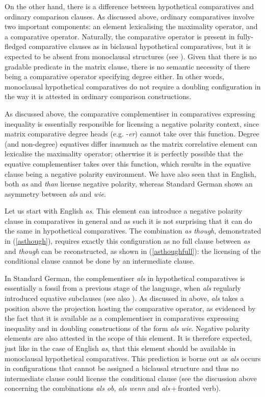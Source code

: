 On the other hand, there is a difference between hypothetical comparatives and ordinary comparison clauses. As discussed above, ordinary comparatives involve two important components: an element lexicalising the maximality operator, and a comparative operator. Naturally, the comparative operator is present in fully-fledged comparative clauses as in biclausal hypothetical comparatives, but it is expected to be absent from monoclausal structures (see \citealt{bacskaiatkari2018jb}). Given that there is no gradable predicate in the matrix clause, there is no semantic necessity of there being a comparative operator specifying degree either. In other words, monoclausal hypothetical comparatives do not require a doubling configuration in the way it is attested in ordinary comparison constructions.

As discussed above, the comparative complementiser in comparatives expressing inequality is essentially responsible for licensing a negative polarity context, since matrix comparative degree heads (e.g. -\textit{er}) cannot take over this function. Degree (and non-degree) equatives differ inasmuch as the matrix correlative element can lexicalise the maximality operator; otherwise it is perfectly possible that the equative complementiser takes over this function, which results in the equative clause being a negative polarity environment. We have also seen that in English, both \textit{as} and \textit{than} license negative polarity, whereas Standard German shows an asymmetry between \textit{als} and \textit{wie}.

Let us start with English \textit{as}. This element can introduce a negative polarity clause in comparatives in general and as such it is not surprising that it can do the same in hypothetical comparatives. The combination \textit{as though}, demonstrated in (\ref{asthough}), requires exactly this configuration as no full clause between \textit{as} and \textit{though} can be reconstructed, as shown in (\ref{asthoughfull}): the licensing of the conditional clause cannot be done by an intermediate clause.

In Standard German, the complementiser \textit{als} in hypothetical comparatives is essentially a fossil from a previous stage of the language, when \textit{als} regularly introduced equative subclauses (see also \citealt{jaeger2010, jaeger2018}). As discussed in  above, \textit{als} takes a position above the projection hosting the comparative operator, as evidenced by the fact that it is available as a complementiser in comparatives expressing inequality and in doubling constructions of the form \textit{als wie}. Negative polarity elements are also attested in the scope of this element. It is therefore expected, just like in the case of English \textit{as}, that this element should be available in monoclausal hypothetical comparatives. This prediction is borne out as \textit{als} occurs in configurations that cannot be assigned a biclausal structure and thus no intermediate clause could license the conditional clause (see the discussion above concerning the combinations \textit{als ob}, \textit{als wenn} and \textit{als}\,+\,fronted verb).

